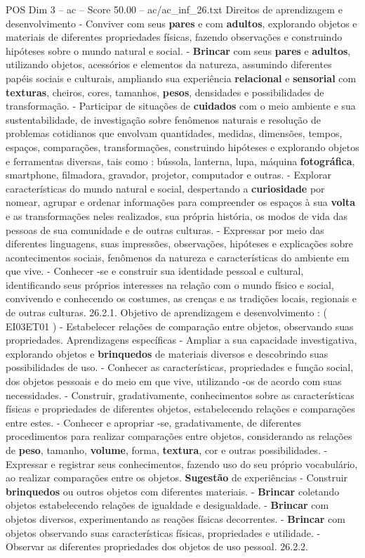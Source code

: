 \begin{textsample}{POS Dim 3 – ac – Score 50.00 – ac/ac\_inf\_26.txt}
Direitos de aprendizagem e desenvolvimento - Conviver com seus \textbf{pares} e com \textbf{adultos}, explorando objetos e materiais de diferentes propriedades físicas, fazendo observações e construindo hipóteses sobre o mundo natural e social. - \textbf{Brincar} com seus \textbf{pares} e \textbf{adultos}, utilizando objetos, acessórios e elementos da natureza, assumindo diferentes papéis sociais e culturais, ampliando sua experiência \textbf{relacional} e \textbf{sensorial} com \textbf{texturas}, cheiros, cores, tamanhos, \textbf{pesos}, densidades e possibilidades de transformação. - Participar de situações de \textbf{cuidados} com o meio ambiente e sua sustentabilidade, de investigação sobre fenômenos naturais e resolução de problemas cotidianos que envolvam quantidades, medidas, dimensões, tempos, espaços, comparações, transformações, construindo hipóteses e explorando objetos e ferramentas diversas, tais como : bússola, lanterna, lupa, máquina \textbf{fotográfica}, smartphone, filmadora, gravador, projetor, computador e outras. - Explorar características do mundo natural e social, despertando a \textbf{curiosidade} por nomear, agrupar e ordenar informações para compreender os espaços à sua \textbf{volta} e as transformações neles realizados, sua própria história, os modos de vida das pessoas de sua comunidade e de outras culturas. - Expressar por meio das diferentes linguagens, suas impressões, observações, hipóteses e explicações sobre acontecimentos sociais, fenômenos da natureza e características do ambiente em que vive. - Conhecer -se e construir sua identidade pessoal e cultural, identificando seus próprios interesses na relação com o mundo físico e social, convivendo e conhecendo os costumes, as crenças e as tradições locais, regionais e de outras culturas. 26.2.1.
Objetivo de aprendizagem e desenvolvimento : ( EI03ET01 ) - Estabelecer relações de comparação entre objetos, observando suas propriedades.
Aprendizagens específicas - Ampliar a sua capacidade investigativa, explorando objetos e \textbf{brinquedos} de materiais diversos e descobrindo suas possibilidades de uso. - Conhecer as características, propriedades e função social, dos objetos pessoais e do meio em que vive, utilizando -os de acordo com suas necessidades. - Construir, gradativamente, conhecimentos sobre as características físicas e propriedades de diferentes objetos, estabelecendo relações e comparações entre estes. - Conhecer e apropriar -se, gradativamente, de diferentes procedimentos para realizar comparações entre objetos, considerando as relações de \textbf{peso}, tamanho, \textbf{volume}, forma, \textbf{textura}, cor e outras possibilidades. - Expressar e registrar seus conhecimentos, fazendo uso do seu próprio vocabulário, ao realizar comparações entre os objetos. \textbf{Sugestão} de experiências - Construir \textbf{brinquedos} ou outros objetos com diferentes materiais. - \textbf{Brincar} coletando objetos estabelecendo relações de igualdade e desigualdade. - \textbf{Brincar} com objetos diversos, experimentando as reações físicas decorrentes. - \textbf{Brincar} com objetos observando suas características físicas, propriedades e utilidade. - Observar as diferentes propriedades dos objetos de uso pessoal. 26.2.2.

\end{textsample}
